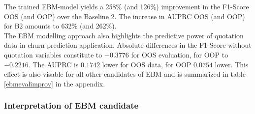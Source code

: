 \documentclass[12pt,titlepage]{article}
\begin{document}
\noindent
The trained EBM-model yields a 258\% (and 126\%) improvement in the F1-Score OOS (and OOP) over the Baseline 2. The increase in AUPRC OOS (and OOP) for B2 amounts to 632\% (and 262\%). \\
The EBM modelling approach also highlights the predictive power of quotation data in churn prediction application. Absolute differences in the F1-Score without quotation variables constitute to $-0.3776$ for OOS evaluation, for OOP to $-0.2216$. The AUPRC is $0.1742$ lower for OOS data, for OOP $0.0754$ lower. This effect is also visable for all other candidates of EBM and is summarized in table \ref{ebmevalimprov} in the appendix. \\

\subsubsection*{Interpretation of EBM candidate}
\end{document}
